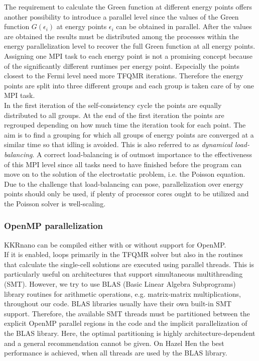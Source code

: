 \documentclass [a4paper, 12pt]{article}
\begin{document}
The requirement to calculate the Green function at different energy points offers another possibility to
introduce a parallel level since the values of the Green function $G(\epsilon_i)$ at energy points $\epsilon_i$
can be obtained in parallel.
After the values are obtained the results must be distributed among the processes within
the energy parallelization level to recover the full Green function at all energy points.
\\
Assigning one MPI task to each energy point is not a promising concept because
of the significantly different runtimes per energy point. Especially the points closest to the
Fermi level 
need more TFQMR iterations.
Therefore the energy points are split into three different groups and each group is taken care of by
one MPI task.
\\
In the first iteration of the self-consistency cycle the points are equally distributed to all
groups. At the end of the first iteration the points are regrouped depending on how much time the iteration took
for each point. The aim is to find a grouping for which all groups of energy points are converged at
a similar time so that idling is avoided. This is also referred to as \textit{dynamical load-balancing}.
A correct load-balancing is of outmost importance to the effectiveness of this MPI level since
all tasks need to have finished before the program can move on to the solution of the electrostatic problem,
i.e. the Poisson equation.
Due to the challenge that load-balancing can pose, parallelization over energy points should only be used, 
if plenty of processor cores
ought to be utilized and the Poisson solver is well-scaling.

\subsubsection*{OpenMP parallelization}

KKRnano can be compiled either with or without support for OpenMP.
\\
If it is enabled,
loops primarily in the TFQMR solver but also in the routines that calculate the single-cell
solutions are executed using parallel threads. 
This is particularly useful on architectures that support simultaneous multithreading (SMT).
However, we try to use BLAS (Basic Linear Algebra Subprograms) library routines for arithmetic
operations, e.g. matrix-matrix multiplications, throughout our code. BLAS libraries usually
have their own built-in SMT support.
Therefore, the available SMT threads must be partitioned between the explicit OpenMP 
parallel regions in the code and the implicit parallelization of the BLAS library.
Here, the optimal partitioning is highly architecture-dependent and a general recommendation cannot
be given. On Hazel Hen the best performance is achieved, when all threads are used by the BLAS library.
\end{document}
